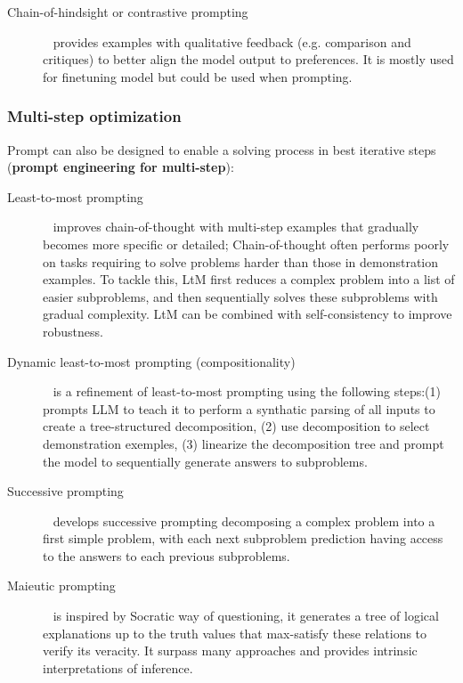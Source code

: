 \documentclass[acmsmall]{acmart}
\begin{document}
\begin{description}
            \item [Chain-of-hindsight or contrastive prompting]~\citep{liuChainHindsightAligns2023, paranjapePromptingContrastiveExplanations2021} provides examples with qualitative feedback (e.g. comparison and critiques) to better align the model output to preferences. It is mostly used for finetuning model but could be used when prompting.
    \end{description}

\subsubsection{Multi-step optimization}
Prompt can also be designed to enable a solving process in best iterative steps (\textbf{prompt engineering for multi-step}):
    \begin{description}
        \item [Least-to-most prompting]~\citep{zhouLeasttoMostPromptingEnables2022} improves chain-of-thought with multi-step examples that gradually becomes more specific or detailed; Chain-of-thought often performs poorly on tasks requiring to solve problems harder than those in demonstration examples. To tackle this, LtM first reduces a complex problem into a list of easier subproblems, and then sequentially solves these subproblems with gradual complexity. LtM can be combined with self-consistency to improve robustness.
        \item [Dynamic least-to-most prompting (compositionality)]~\citep{drozdovCompositionalSemanticParsing2022} is a refinement of least-to-most prompting using the following steps:(1) prompts LLM to teach it to perform a synthatic parsing of all inputs to create a tree-structured decomposition, (2) use decomposition to select demonstration exemples, (3) linearize the decomposition tree and prompt the model to sequentially generate answers to subproblems.
        \item [Successive prompting]~\citep{duaSuccessivePromptingDecomposing2022} develops successive prompting decomposing a complex problem into a first simple problem, with each next subproblem prediction having access to the answers to each previous subproblems.
        \item [Maieutic prompting]~\citep{jungMaieuticPromptingLogically2022} is inspired by Socratic way of questioning, it generates a tree of logical explanations up to the truth values that max-satisfy these relations to verify its veracity. It surpass many approaches and provides intrinsic interpretations of inference.
    \end{description}
\end{document}
